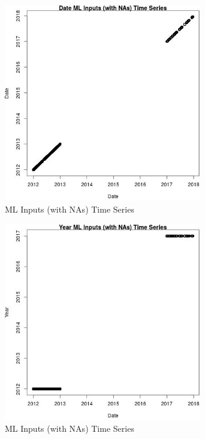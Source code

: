 \begin{figure} 
\centering  
\includegraphics[width=0.77\textwidth]{Code_Outputs/Report_ML_input_PM25_Step4_part_e_de_duplicated_aves_compiled_2019-05-14wNAs_DatevDate.jpg} 
\caption{\label{fig:Report_ML_input_PM25_Step4_part_e_de_duplicated_aves_compiled_2019-05-14wNAsDatevDate}ML Inputs (with NAs) Time Series} 
\end{figure} 
 

\begin{figure} 
\centering  
\includegraphics[width=0.77\textwidth]{Code_Outputs/Report_ML_input_PM25_Step4_part_e_de_duplicated_aves_compiled_2019-05-14wNAs_YearvDate.jpg} 
\caption{\label{fig:Report_ML_input_PM25_Step4_part_e_de_duplicated_aves_compiled_2019-05-14wNAsYearvDate}ML Inputs (with NAs) Time Series} 
\end{figure} 
 


